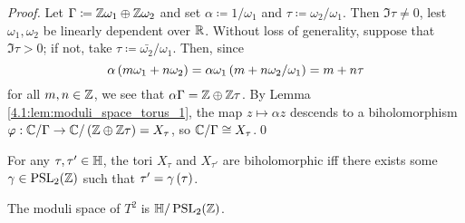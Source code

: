 \documentclass[../Moduli_Spaces_of_Riemann_Surfaces.tex]{subfiles}
\begin{document}
    \begin{proof}
        Let $\Gamma\coloneqq\mathbb{Z}\omega_1\oplus\mathbb{Z}\omega_2$ and set $\alpha\coloneqq1/\omega_1$ and $\tau\coloneqq\omega_2/\omega_1$. Then $\Im\tau\neq0$, lest $\omega_1,\omega_2$ be linearly dependent over $\mathbb{R}$. Without loss of generality, suppose that $\Im\tau>0$; if not, take $\tau\coloneqq\bar{\omega_2}/\omega_1$. Then, since
        \begin{equation*}
            \alpha\left(m\omega_1+n\omega_2\right)=\alpha\omega_1\left(m+n\omega_2/\omega_1\right)=m+n\tau
        \end{equation*}
        for all $m,n\in\mathbb{Z}$, we see that $\alpha\Gamma=\mathbb{Z}\oplus\mathbb{Z}\tau$. By Lemma \ref{4.1:lem:moduli_space_torus_1}, the map $z\mapsto\alpha z$ descends to a biholomorphism $\varphi:\mathbb{C}/\Gamma\to\mathbb{C}/\left(\mathbb{Z}\oplus\mathbb{Z}\tau\right)=X_\tau$, so $\mathbb{C}/\Gamma\cong X_\tau$.\qed
    \end{proof}
    \begin{theorem}
        For any $\tau,\tau'\in\mathbb{H}$, the tori $X_{\tau}$ and $X_{\tau'}$ are biholomorphic iff there exists some $\gamma\in\operatorname{PSL}_{2}\!\left(\mathbb{Z}\right)$ such that $\tau'=\gamma\left(\tau\right)$.
    \end{theorem}
    \begin{corollary}
        The moduli space of $T^2$ is $\mathbb{H}/\operatorname{PSL}_{2}\!\left(\mathbb{Z}\right)$.
    \end{corollary}
\end{document}
